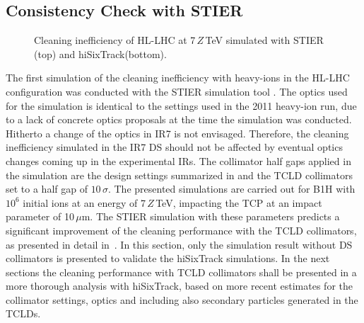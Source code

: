 \subsection{Consistency Check with STIER}


\begin{figure}[t]
  \centering
  \caption{Cleaning inefficiency of HL-LHC at 7$\,Z\,$TeV simulated with STIER (top) and hiSixTrack(bottom).}  
  \label{pic:16072301}
  \end{figure}

The first simulation of the cleaning inefficiency with heavy-ions in the HL-LHC configuration was conducted with the STIER simulation tool . The optics used for the simulation is identical to the settings used in the 2011 heavy-ion run, due to a lack of concrete optics proposals at the time the simulation was conducted. Hitherto a change of the optics in IR7 is not envisaged. Therefore, the cleaning inefficiency simulated in the IR7 DS should not be affected by eventual optics changes coming up in the experimental IRs. The collimator half gaps applied in the simulation are the design settings summarized in  and the TCLD collimators set to a half gap of $10\,\sigma$. The presented simulations are carried out for B1H with $10^6$ initial \lead ions at an energy of 7$\,Z\,$TeV, impacting the TCP at an impact parameter of 10$\,\mu$m. The STIER simulation with these parameters predicts a significant improvement of the cleaning performance with the TCLD collimators, as presented in detail in~\cite{phermes_ipac2015_1}. In this section, only the simulation result without DS collimators is presented to validate the hiSixTrack simulations. In the next sections the cleaning performance with TCLD collimators shall be presented in a more thorough analysis with hiSixTrack, based on more recent estimates for the collimator settings, optics and including also secondary particles generated in the TCLDs. 


